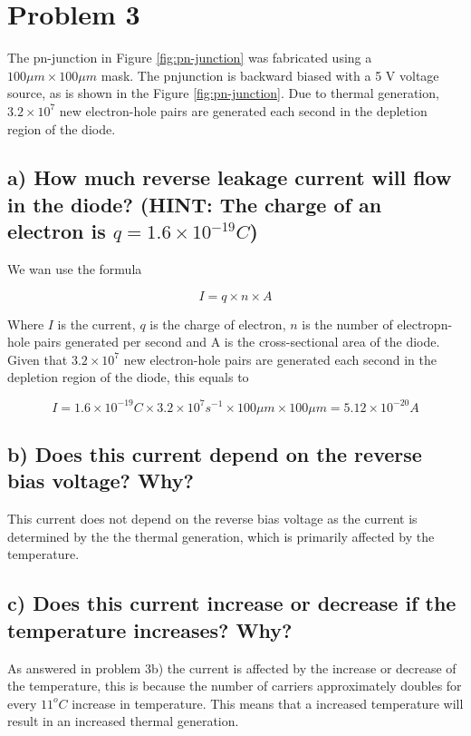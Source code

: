 \section{Problem 3}

The pn-junction in Figure \ref*{fig:pn-junction} was fabricated using a $100 \mu m \times 100 \mu m$ mask. The pnjunction is backward biased with a 5 V voltage source, as is shown in the Figure \ref*{fig:pn-junction}. Due to thermal generation, $3.2 \times 10^7$ new electron-hole pairs are generated each second in the depletion region of the diode.


\subsection*{a) How much reverse leakage current will flow in the diode? (HINT: The charge of an
electron is $q = 1.6 \times 10^{-19} C$)}

We wan use the formula

\begin{equation*}
    I=q\times n \times A
\end{equation*}

Where $I$ is the current, $q$ is the charge of electron, $n$ is the number of electropn-hole pairs generated per second and A is the cross-sectional area of the diode. Given that $3.2 \times 10^7$ new electron-hole pairs are generated each second in the depletion region of the diode, this equals to 

\begin{equation*}
    I=1.6 \times 10^{-19} C \times 3.2 \times 10^7 s^{-1} \times 100 \mu m \times 100 \mu m = 5.12\times 10^{-20} A
\end{equation*}

\subsection*{b) Does this current depend on the reverse bias voltage? Why?}
This current does not depend on the reverse bias voltage as the current is determined by the the thermal generation, which is primarily affected by the temperature.

\subsection*{c) Does this current increase or decrease if the temperature increases? Why?}
As answered in problem 3b) the current is affected by the increase or decrease of the temperature, this is because the number of carriers approximately doubles for every $11^o C$ increase in temperature. This means that a increased temperature will result in an increased thermal generation.

